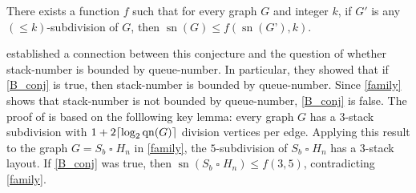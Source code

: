 \documentclass[kpfonts]{patmorin}
\DeclareMathOperator{\sn}{sn}
\DeclareMathOperator{\qn}{qn}
\renewcommand{\leq}{\leqslant}
\newcommand{\CartProd}{\mathbin{\square}}
\begin{document}
\begin{conj}[\citep{BO99}]
\label{B_conj}
There exists a function $f$ such that for every graph $G$ and integer $k$, if $G'$ is any $(\leq k)$-subdivision of $G$, then $\sn(G) \leq f(\sn(G’),k)$.
\end{conj}

\citet{DujWoo05} established a connection between this conjecture and the question of whether stack-number is bounded by queue-number. In particular, they showed that if
\cref{B_conj} is true, then stack-number is bounded by queue-number. Since \cref{family} shows that stack-number is not bounded by queue-number, \cref{B_conj} is false. The proof of \citet{DujWoo05} is based on the folllowing key lemma: every graph $G$ has a $3$-stack subdivision with $1+2 \ceil{\log_2\qn(G)}$ division vertices per edge. Applying this result to the graph $G=S_b\CartProd H_n$ in \cref{family},
the $5$-subdivision of $S_b\CartProd H_n$ has a $3$-stack layout. If \cref{B_conj} was true, then $\sn(S_b\CartProd H_n) \leq f( 3,5)$, contradicting \cref{family}.






\end{document}
